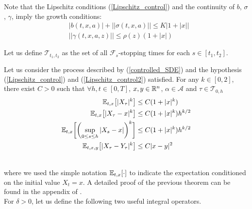 Note that the Lipschitz conditions (\ref{Lipschitz_control}) and the continuity of $b$, $\sigma$, $\gamma$, imply the growth conditions:
\begin{align}
 & |b(t,x,a)| + ||\sigma(t,x,a)||  \leq K |1+|x|| \\  
 & || \gamma(t,x,a,z) || \leq \rho(z) (1+|x|) \label{Growth_control2}
\end{align}


\begin{Definition}
 Let us define $\mathcal{T}_{t_1,t_2}$ as the set of all $\mathcal{F}_s$-stopping times for each $ s \in [t_1,t_2]$.
\end{Definition}
\begin{Theorem}
 Let us consider the process described by (\ref{controlled_SDE}) and the hypothesis (\ref{Lipschitz_control}) and (\ref{Lipschitz_control2}) satisfied. 
 For any $k \in [0,2]$, there exist $C>0$ such that $\forall h,t \in [0,T]$, $x,y \in \mathbb{R}^n$, 
 $\alpha \in \mathcal{A}$ and $\tau \in \mathcal{T}_{0,h}$
 \begin{align}
  \mathbb{E}_{t,x}\bigl[ |X_{\tau}|^k \bigr] &\leq C (1+|x|^k) \\ \label{cond_2}
  \mathbb{E}_{t,x}\bigl[ |X_{\tau} - x|^k \bigr] &\leq C (1+|x|^k)h^{k/2} \\ \label{cond_3}
  \mathbb{E}_{t,x}\biggl[ \biggl( \sup_{0\leq s\leq h} |X_{s} - x| \biggr)^k \biggr] &\leq C (1+|x|^k)h^{k/2} \\ 
  \mathbb{E}_{t,x,y}\bigl[ |X_{\tau} - Y_{\tau}|^k \bigr] &\leq C |x-y|^2 \\ \nonumber
 \end{align}
\end{Theorem}
where we used the simple notation $\mathbb{E}_{t,x}[\cdot]$ to indicate the expectation conditioned on the initial value $X_t=x$.   
A detailed proof of the previous theorem can be found in the appendix of \cite{Ph98}. \\

\noindent
For $\delta > 0$, let us define the following two useful integral operators.

